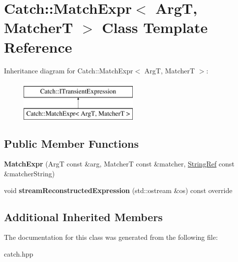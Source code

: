 \hypertarget{class_catch_1_1_match_expr}{}\section{Catch\+:\+:Match\+Expr$<$ ArgT, MatcherT $>$ Class Template Reference}
\label{class_catch_1_1_match_expr}
Inheritance diagram for Catch\+:\+:Match\+Expr$<$ ArgT, MatcherT $>$\+:\begin{figure}[H]
\begin{center}
\leavevmode
\includegraphics[height=2.000000cm]{class_catch_1_1_match_expr}
\end{center}
\end{figure}
\subsection*{Public Member Functions}
\begin{DoxyCompactItemize}
\item 
\mbox{\label{class_catch_1_1_match_expr_ae55ee9bf46c8676c65e9df291a98c345}} 
{\bfseries Match\+Expr} (ArgT const \&arg, MatcherT const \&matcher, \mbox{\hyperlink{class_catch_1_1_string_ref}{String\+Ref}} const \&matcher\+String)
\item 
\mbox{\label{class_catch_1_1_match_expr_ad3e41adb597750b2219bb37e51185629}} 
void {\bfseries stream\+Reconstructed\+Expression} (std\+::ostream \&os) const override
\end{DoxyCompactItemize}
\subsection*{Additional Inherited Members}


The documentation for this class was generated from the following file\+:\begin{DoxyCompactItemize}
\item 
catch.\+hpp\end{DoxyCompactItemize}
